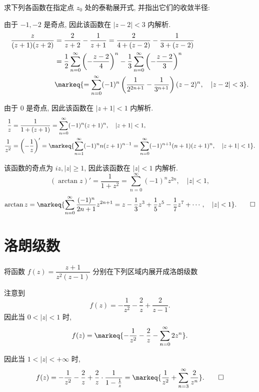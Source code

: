 \begin{exercise}[2]
	求下列各函数在指定点 $z_0$ 处的泰勒展开式, 并指出它们的收敛半径:
\end{exercise}
\begin{solution}
	\subex 由于 $-1,-2$ 是奇点, 因此该函数在 $|z-2|<3$ 内解析.
	\begin{align*}
	\frac{z}{(z+1)(z+2)}&=\frac{2}{z+2}-\frac{1}{z+1}
	=\frac{2}{4+(z-2)}-\frac{1}{3+(z-2)}\\
	&=\frac12\sum_{n=0}^\infty\left(-\frac{z-2}4\right)^n
	-\frac13\sum_{n=0}^\infty\left(-\frac{z-2}3\right)^n\\
	&\markeq{=\sum_{n=0}^\infty(-1)^n\left(\frac1{2^{2n+1}}
	-\frac1{3^{n+1}}\right)(z-2)^n,\quad|z-2|<3}.
	\end{align*}

	\subex 由于 $0$ 是奇点, 因此该函数在 $|z+1|<1$ 内解析.
	\begin{align*}
	\frac1z&=\frac1{1+(z+1)}=\sum_{n=0}^\infty(-1)^n(z+1)^n,\quad|z+1|<1,\\
	\frac1{z^2}&=\left(-\frac1z\right)'
	=\markeq{\sum_{n=1}^\infty(-1)^nn(z+1)^{n-1}
	=\sum_{n=0}^\infty(-1)^{n+1}(n+1)(z+1)^n,\quad|z+1|<1}.
	\end{align*}

	\subex 该函数的奇点为 $iz,|z|\ge 1$, 因此该函数在 $|z|<1$ 内解析.
	\[(\arctan z)'=\frac1{1+z^2}=\sum_{n=0}^\infty(-1)^nz^{2n},\quad|z|<1,\]
	\[\arctan z=\markeq{\sum_{n=0}^\infty\frac{(-1)^n}{2n+1}z^{2n+1}
	=z-\frac13z^3+\frac15z^5-\frac17z^7+\cdots,\quad|z|<1}.\qedhere\]
\end{solution}

	
\section{洛朗级数}


\begin{exercise}[2]
	将函数 $f(z)=\dfrac{z+1}{z^2(z-1)}$ 分别在下列区域内展开成洛朗级数
\end{exercise}
\begin{solution}
	\subex 注意到
	\[f(z)=-\frac1{z^2}-\frac2z+\frac{2}{z-1}.\]
	因此当 $0<|z|<1$ 时,
	\[f(z)=\markeq{-\frac1{z^2}-\frac2z-\sum_{n=0}^\infty 2z^n}.\]
	
	\subex 
	因此当 $1<|z|<+\infty$ 时,
	\[f(z)=-\frac1{z^2}-\frac2z+\frac2z\cdot\frac1{1-\frac1z}
	=\markeq{\frac1{z^2}+\sum_{n=3}^\infty \frac2{z^n}}.\qedhere\]
\end{solution}


